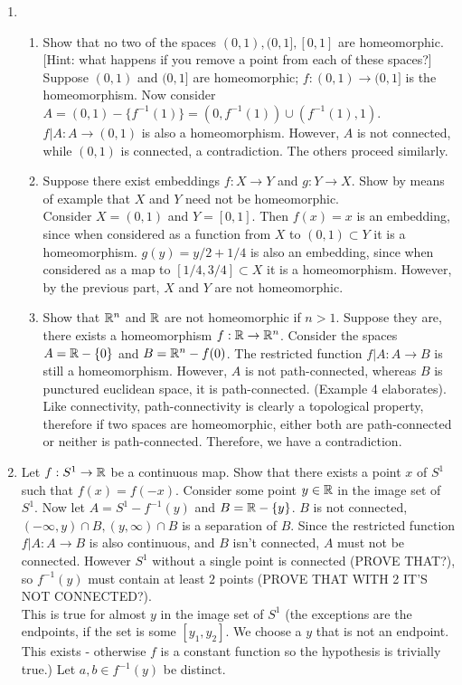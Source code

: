 \documentclass[12pt,letterpaper]{article}
\begin{document}
\RaggedRight
\begin{enumerate}
  \item \begin{enumerate}
    \item Show that no two of the spaces $(0,1), (0,1], [0,1]$ are homeomorphic. [Hint: what happens if you remove a point from each of these spaces?] \\
    Suppose $(0,1)$ and $(0,1]$ are homeomorphic; $f:(0,1)\rightarrow (0,1]$ is the homeomorphism. Now consider $A=(0,1) - \{f^{-1}(1)\} = (0,f^{-1}(1)) \cup (f^{-1}(1),1)$. $f|A: A\rightarrow (0,1)$ is also a homeomorphism. However, $A$ is not connected, while $(0,1)$ is connected, a contradiction. The others proceed similarly.
    \item Suppose there exist embeddings $f: X\rightarrow Y$ and $g: Y\rightarrow X$. Show by means of example that $X$ and $Y$ need not be homeomorphic. \\
    Consider $X=(0,1)$ and $Y=[0,1]$. Then $f(x) = x$ is an embedding, since when considered as a function from $X$ to $(0,1)\subset Y$ it is a homeomorphism. $g(y)=y/2+1/4$ is also an embedding, since when considered as a map to $[1/4,3/4]\subset X$ it is a homeomorphism. However, by the previous part, $X$ and $Y$ are not homeomorphic.
    \item Show that $\mathbb{R}^n$ and $\mathbb{R}$ are not homeomorphic if $n>1$.
    Suppose they are, there exists a homeomorphism $f:\mathbb{R}\rightarrow\mathbb{R}^n$. Consider the spaces $A=\mathbb{R}-\{0\}$ and $B=\mathbb{R}^n-{f(0)}$. The restricted function $f|A: A\rightarrow B$ is still a homeomorphism. However, $A$ is not path-connected, whereas $B$ is punctured euclidean space, it is path-connected. (Example 4 elaborates). Like connectivity, path-connectivity is clearly a topological property, therefore if two spaces are homeomorphic, either both are path-connected or neither is path-connected. Therefore, we have a contradiction.
  \end{enumerate}
  \item Let $f:S^1\rightarrow\mathbb{R}$ be a continuous map. Show that there exists a point $x$ of $S^1$ such that $f(x)=f(-x)$.
  Consider some point $y\in\mathbb{R}$ in the image set of $S^1$. Now let $A=S^1-f^{-1}(y)$ and $B=\mathbb{R}-\{y\}$. $B$ is not connected, $(-\infty,y)\cap B, (y,\infty)\cap B$ is a separation of $B$. Since the restricted function $f|A: A\rightarrow B$ is also continuous, and $B$ isn't connected, $A$ must not be connected. However $S^1$ without a single point is connected (PROVE THAT?), so $f^{-1}(y)$ must contain at least $2$ points (PROVE THAT WITH 2 IT'S NOT CONNECTED?). \\
  This is true for almost $y$ in the image set of $S^1$ (the exceptions are the endpoints, if the set is some $[y_1,y_2]$. We choose a $y$ that is not an endpoint. This exists - otherwise $f$ is a constant function so the hypothesis is trivially true.) Let $a,b\in f^{-1}(y)$ be distinct. 
\end{enumerate}
\end{document}
